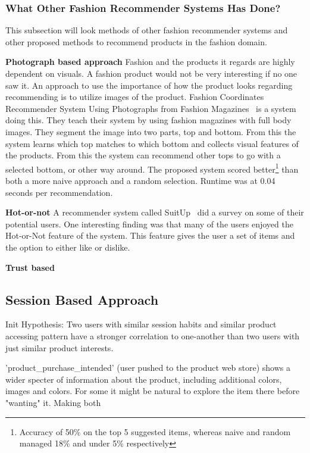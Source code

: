 \subsubsection{What Other Fashion Recommender Systems Has Done?}
This subsection will look methods of other fashion recommender systems and other proposed methods to recommend products in the fashion domain.

\textbf{Photograph based approach}
Fashion and the products it regards are highly dependent on visuals.
A fashion product would not be very interesting if no one saw it.
An approach to use the importance of how the product looks regarding recommending is to utilize images of the product.
Fashion Coordinates Recommender System Using Photographs from Fashion Magazines~\cite{Iwata:2011} is a system doing this.
They teach their system by using fashion magazines with full body images.
They segment the image into two parts, top and bottom.
From this the system learns which top matches to which bottom and collects visual features of the products.
From this the system can recommend other tops to go with a selected bottom, or other way around.
The proposed system scored better\footnote{Accuracy of 50\% on the top 5 suggested items, whereas naive and random managed 18\% and under 5\% respectively} than both a more naive approach and a random selection.
Runtime was at 0.04 seconds per recommendation.

\textbf{Hot-or-not}
A recommender system called SuitUp~\cite{SuitUp} did a survey on some of their potential users.
One interesting finding was that many of the users enjoyed the Hot-or-Not feature of the system.
This feature gives the user a set of items and the option to either like or dislike.

\textbf{Trust based}



\subsection{Session Based Approach}
Init Hypothesis:
Two users with similar session habits and similar product accessing pattern
have a stronger correlation to one-another than two users with just similar
product interests.


'product\_purchase\_intended' (user pushed to the product web store) shows a
wider specter of information about the product, including additional colors,
images and colors.  For some it might be natural to explore the item there
before "wanting" it. Making both


